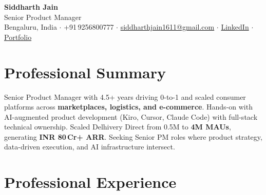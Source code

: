 \documentclass[letterpaper,10.5pt]{article}
\newcommand{\metric}[1]{\textbf{#1}}
\begin{document}
\begin{center}
  {\LARGE\bfseries\color{darktext} Siddharth Jain}\\[5pt]
  {\color{medtext}Senior Product Manager}\\[4pt]
  {\small\color{lighttext}
    Bengaluru, India
    \enspace$\cdot$\enspace
    +91\,9256800777
    \enspace$\cdot$\enspace
    \href{mailto:siddharthjain1611@gmail.com}{siddharthjain1611@gmail.com}
    \enspace$\cdot$\enspace
    \href{https://linkedin.com/in/siddharth-jain}{LinkedIn}
    \enspace$\cdot$\enspace
    \href{https://siddharthjain1611.github.io}{Portfolio}
  }
\end{center}

\vspace{-2pt}

\section{Professional Summary}
\vspace{2pt}
\noindent\color{medtext}
Senior Product Manager with 4.5+ years driving 0-to-1 and scaled consumer platforms across \textbf{marketplaces, logistics, and e-commerce}. Hands-on with AI-augmented product development (Kiro, Cursor, Claude Code) with full-stack technical ownership. Scaled Delhivery Direct from 0.5M to \metric{4M MAUs}, generating \metric{INR 80\,Cr+ ARR}. Seeking Senior PM roles where product strategy, data-driven execution, and AI infrastructure intersect.

\section{Professional Experience}
\end{document}
